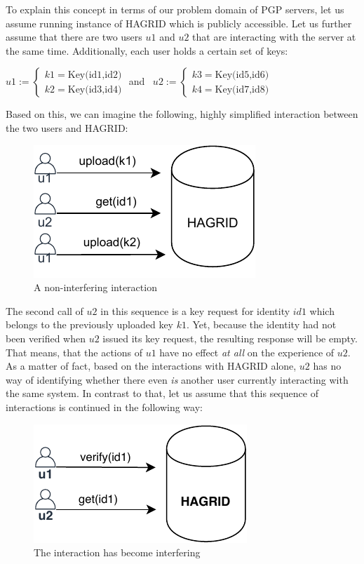 To explain this concept in terms of our problem domain of PGP servers, let us assume running instance of HAGRID which is publicly accessible. Let us further assume that there are two users \(u1\) and \(u2\) that are interacting with the server at the same time. Additionally, each user holds a certain set of keys:


\(
    u1 := \begin{cases}
        k1 = \text{Key(id1,id2)} \\
        k2 = \text{Key(id3,id4)}
    \end{cases}
    \) and \, \(
    u2 := \begin{cases}
        k3 = \text{Key(id5,id6)} \\
        k4 = \text{Key(id7,id8)}
    \end{cases}
    \)

Based on this, we can imagine the following, highly simplified interaction between the two users and HAGRID:
\begin{figure}[H]
    \label{fig:example}
    \centering
    \includegraphics{images/non_interference.pdf}
    \caption{A non-interfering interaction}
\end{figure}

The second call of \(u2\) in this sequence is a key request for identity \(id1\) which belongs to the previously uploaded key \(k1\). Yet, because the identity had not been verified when \(u2\) issued its key request, the resulting response will be empty. That means, that the actions of \(u1\) have no effect \emph{at all} on the experience of \(u2\). 
As a matter of fact, based on the interactions with HAGRID alone, \(u2\) has no way of identifying whether there even \emph{is} another user currently interacting with the same system. 
In contrast to that, let us assume that this sequence of interactions is continued in the following way: 
\begin{figure}[h]
    \label{fig:example}
    \centering
    \includegraphics{images/interfering.pdf}
    \caption{The interaction has become interfering}
\end{figure}

